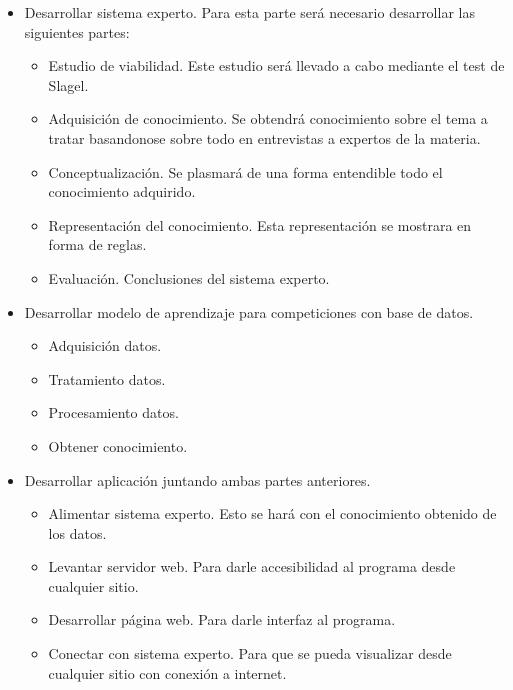 \documentclass[11pt,a4paper,twoside,final]{article}
\begin{document}



\begin{itemize}
    \item Desarrollar sistema experto. Para esta parte será necesario desarrollar las siguientes partes:
    \begin{itemize}
        \item Estudio de viabilidad. Este estudio será llevado a cabo mediante el test de Slagel.
        \item Adquisición de conocimiento. Se obtendrá conocimiento sobre el tema a tratar basandonose sobre todo en entrevistas a expertos de la materia.
        \item Conceptualización. Se plasmará de una forma entendible todo el conocimiento adquirido.
        \item Representación del conocimiento. Esta representación se mostrara en forma de reglas.
        \item Evaluación. Conclusiones del sistema experto.
    \end{itemize}
    \item Desarrollar modelo de aprendizaje para competiciones con base de datos.
    \begin{itemize}
        \item Adquisición datos.
        \item Tratamiento datos.
        \item Procesamiento datos.
        \item Obtener conocimiento.
    \end{itemize}
    \item Desarrollar aplicación juntando ambas partes anteriores.
    \begin{itemize}
        \item Alimentar sistema experto. Esto se hará con el conocimiento obtenido de los datos.
        \item Levantar servidor web. Para darle accesibilidad al programa desde cualquier sitio.
        \item Desarrollar página web. Para darle interfaz al programa.
        \item Conectar con sistema experto. Para que se pueda visualizar desde cualquier sitio con conexión a internet.
    \end{itemize}
\end{itemize}
\end{document}

